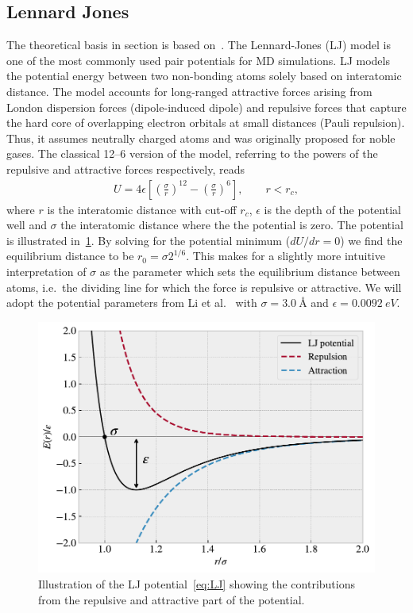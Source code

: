 \subsection{Lennard Jones}\label{sec:LJ}
The theoretical basis in section is based on~\cite{docs_lammps_LJ,
C9CP05445F, chem_libretexts_LJ}. The Lennard-Jones (\acrshort{LJ}) model is one of the most commonly used pair potentials for \acrshort{MD} simulations. \acrshort{LJ} models the potential energy between two non-bonding atoms solely based on interatomic distance. The model accounts for long-ranged attractive forces arising from London dispersion forces (dipole-induced dipole) and repulsive forces that capture the hard core of overlapping electron orbitals at small distances (Pauli repulsion). Thus, it assumes neutrally charged atoms and was originally proposed for noble gases. The classical 12--6 version of the model, referring to the powers of the repulsive and attractive forces respectively, reads
\begin{align}
  U = 4\epsilon \left[\left(\frac{\sigma}{r}\right)^{12} - \left(\frac{\sigma}{r}\right)^6 \right ], \qquad r < r_c,
  \label{eq:LJ}
\end{align}
where $r$ is the interatomic distance with cut-off $r_c$, $\epsilon$ is the
depth of the potential well and $\sigma$ the interatomic distance where the
the potential is zero. The potential is illustrated in~\cref{fig:LJ_pot}. By solving for the potential minimum ($dU/dr = 0$) we find the equilibrium distance to be $r_0 = \sigma 2^{1/6}$. This makes for a slightly more intuitive interpretation of $\sigma$ as the parameter which sets the equilibrium distance between atoms, i.e.\ the dividing line for which the force is repulsive or attractive. We will adopt the potential parameters from Li et al.~\cite{li_evolving_2016} with $\sigma = \SI{3.0}{\text{Å}}$ and $\epsilon = \SI{0.0092}{eV}$.

\begin{figure}[H]
  \centering
  \includegraphics[width=0.6\linewidth]{figures/theory/LJ_pot.pdf}
  \caption{Illustration of the \acrshort{LJ} potential~\cref{eq:LJ} showing the contributions from the repulsive and attractive part of the potential.}
  \label{fig:LJ_pot}
\end{figure}


